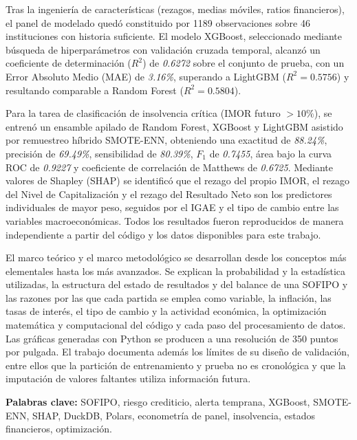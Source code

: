 Tras la ingeniería de características (rezagos, medias móviles, ratios financieros), el panel de modelado quedó constituido por 1189 observaciones sobre 46 instituciones con historia suficiente. El modelo XGBoost, seleccionado mediante búsqueda de hiperparámetros con validación cruzada temporal, alcanzó un coeficiente de determinación ($R^2$) de \textit{0.6272} sobre el conjunto de prueba, con un Error Absoluto Medio (MAE) de \textit{3.16\%}, superando a LightGBM ($R^2=0.5756$) y resultando comparable a Random Forest ($R^2=0.5804$).

Para la tarea de clasificación de insolvencia crítica (IMOR futuro $>10\%$), se entrenó un ensamble apilado de Random Forest, XGBoost y LightGBM asistido por remuestreo híbrido SMOTE-ENN, obteniendo una exactitud de \textit{88.24\%}, precisión de \textit{69.49\%}, sensibilidad de \textit{80.39\%}, $F_1$ de \textit{0.7455}, área bajo la curva ROC de \textit{0.9227} y coeficiente de correlación de Matthews de \textit{0.6725}. Mediante valores de Shapley (SHAP) se identificó que el rezago del propio IMOR, el rezago del Nivel de Capitalización y el rezago del Resultado Neto son los predictores individuales de mayor peso, seguidos por el IGAE y el tipo de cambio entre las variables macroeconómicas. Todos los resultados fueron reproducidos de manera independiente a partir del código y los datos disponibles para este trabajo.

El marco teórico y el marco metodológico se desarrollan desde los conceptos más elementales hasta los más avanzados. Se explican la probabilidad y la estadística utilizadas, la estructura del estado de resultados y del balance de una SOFIPO y las razones por las que cada partida se emplea como variable, la inflación, las tasas de interés, el tipo de cambio y la actividad económica, la optimización matemática y computacional del código y cada paso del procesamiento de datos. Las gráficas generadas con Python se producen a una resolución de 350 puntos por pulgada. El trabajo documenta además los límites de su diseño de validación, entre ellos que la partición de entrenamiento y prueba no es cronológica y que la imputación de valores faltantes utiliza información futura.

\textbf{Palabras clave:} SOFIPO, riesgo crediticio, alerta temprana, XGBoost, SMOTE-ENN, SHAP, DuckDB, Polars, econometría de panel, insolvencia, estados financieros, optimización.

